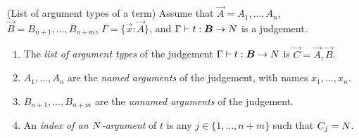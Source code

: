 \begin{definition}(List of argument types of a term)
Assume that $\vec{A} = A_1, \ldots, A_n$, 
$\vec{B}=B_{n+1}, \ldots, B_{n+m}$, 
$\Gamma = \{\vec{x}:\vec{A}\}$,
and $\Gamma \vdash t: \vec{B} \rightarrow \N$ is a judgement.

\begin{enumerate}
\item
The \emph{list of argument types} of the judgement
$\Gamma \vdash t: \vec{B} \rightarrow \N$ 
is $\vec{C} = \vec{A},\vec{B}$. 

\item
$A_1, \ldots, A_n$ are the \emph{named arguments} of the judgement, 
with names $x_1, \ldots, x_n$.

\item
$B_{n+1}, \ldots, B_{n+m}$ are the \emph{unnamed arguments} of the judgement.

\item
An \emph{index of an ${N}$-argument} 
of $t$ is any $j \in \{1, \ldots, n+m\}$ such that $C_j = {N}$.

\end{enumerate}
\end{definition}

